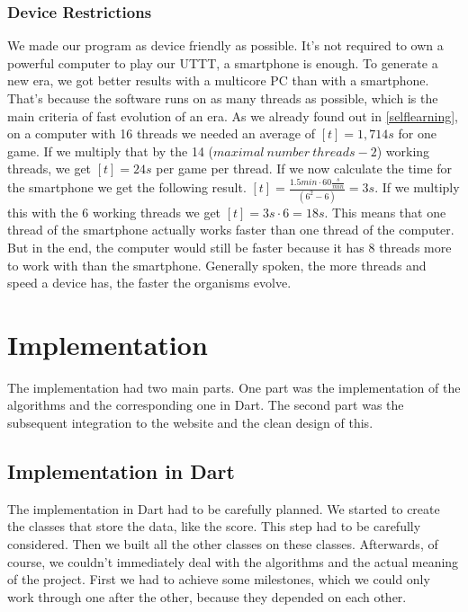 \subsubsection{Device Restrictions}
We made our program as device friendly as possible. It's not required to own a powerful computer to play our \ac{UTTT}, a smartphone is enough. To generate a new era, we got better results with a multicore PC than with a smartphone. That's because the software runs on as many threads as possible, which is the main criteria of fast evolution of an era. 
As we already found out in \autoref{selflearning}, on a computer with 16 threads we needed an average of $[t] = 1,714s$ for one game. If we multiply that by the 14 ($maximal\ number\ threads - 2$) working threads, we get $[t] = 24 s$ per game per thread.
If we now calculate the time for the smartphone we get the following result. $ [t] = \frac{1.5min \cdot 60\frac{s}{min}}{(6^2 - 6)} = 3s$. If we multiply this with the 6 working threads we get $[t] = 3s \cdot 6 = 18s$. This means that one thread of the smartphone actually works faster than one thread of the computer. But in the end, the computer would still be faster because it has 8 threads more to work with than the smartphone.  Generally spoken, the more threads and speed a device has, the faster the organisms evolve.


\section{Implementation}
The implementation had two main parts. One part was the implementation of the algorithms and the corresponding one in Dart. The second part was the subsequent integration to the website and the clean design of this.

\subsection{Implementation in Dart}
The implementation in Dart had to be carefully planned. We started to create the classes that store the data, like the score. This step had to be carefully considered. Then we built all the other classes on these classes. Afterwards, of course, we couldn't immediately deal with the algorithms and the actual meaning of the project. First we had to achieve some milestones, which we could only work through one after the other, because they depended on each other. 


